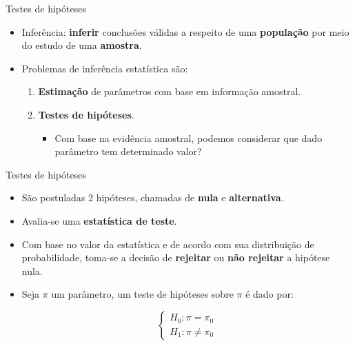\documentclass[
  ignorenonframetext,
  serif,
  professionalfont,
  usenames,
  dvipsnames,
  aspectratio = 169]{beamer}
\begin{document}
\begin{frame}{Testes de hipóteses}
\protect\hypertarget{testes-de-hipuxf3teses-1}{}
\begin{itemize}
    \itemsep 2ex
  
  \item Inferência: \textbf{inferir} conclusões válidas a respeito de uma \textbf{população} por meio do estudo de uma \textbf{amostra}.
  
  \item Problemas de inferência estatística são:
    \begin{enumerate}
    
      \itemsep 2ex
      
      \item \textbf{Estimação} de parâmetros com base em informação amostral.
      
      \item \textbf{Testes de hipóteses}.
        \begin{itemize}
          \item Com base na evidência amostral, podemos considerar que dado parâmetro tem determinado valor?
        \end{itemize}
    
    \end{enumerate}
  
  \end{itemize}
\end{frame}

\begin{frame}{Testes de hipóteses}
\protect\hypertarget{testes-de-hipuxf3teses-2}{}
\begin{itemize}
    \itemsep 2ex
  
  \item São postuladas 2 hipóteses, chamadas de \textbf{nula} e \textbf{alternativa}.
  
  \item Avalia-se uma \textbf{estatística de teste}.
  
  \item Com base no valor da estatística e de acordo com sua distribuição de probabilidade, toma-se a decisão de \textbf{rejeitar} ou \textbf{não rejeitar} a hipótese nula.
    
  \item Seja $\pi$ um parâmetro, um teste de hipóteses sobre $\pi$ é dado por:
  
$$
\left\{\begin{matrix}
H_0: \pi = \pi_0 \\ 
H_1: \pi \neq \pi_0
\end{matrix}\right.
$$  
  
  \end{itemize}
\end{frame}
\end{document}
